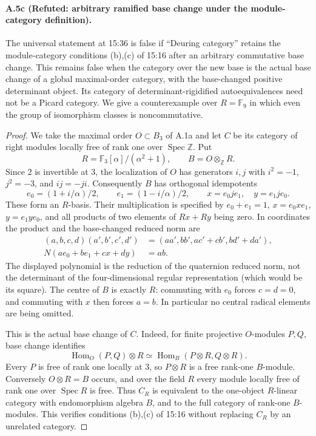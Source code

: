 \paragraph{A.5c (Refuted: arbitrary ramified base change under the module-category definition).}
The universal statement at 15:36 is false if ``Deuring category'' retains
the module-category conditions (b),(c) of 15:16 after an arbitrary
commutative base change. This remains false when the category over the
new base is the actual base change of a global maximal-order category,
with the base-changed positive determinant object. Its category of
determinant-rigidified autoequivalences need not be a Picard category.
We give a counterexample over $R=\mathbb F_9$ in which even the group
of isomorphism classes is noncommutative.

\begin{proof}
We take the maximal order $O\subset B_3$ of A.1a and let $C$ be its
category of right modules locally free of rank one over
$\operatorname{Spec}\mathbb Z$. Put
\[
 R=\mathbb F_3[\alpha]/(\alpha^2+1),\qquad B=O\otimes_{\mathbb Z}R.
\]
Since $2$ is invertible at $3$, the localization of $O$ has generators
$i,j$ with $i^2=-1$, $j^2=-3$, and $ij=-ji$. Consequently $B$ has
orthogonal idempotents
\[
 e_0=(1+i/\alpha)/2,\qquad e_1=(1-i/\alpha)/2,
 \qquad x=e_0je_1,\quad y=e_1je_0.
\]
These form an $R$-basis. Their multiplication is specified by
$e_0+e_1=1$, $x=e_0xe_1$, $y=e_1ye_0$, and all products of two
elements of $Rx+Ry$ being zero. In coordinates the product and the
base-changed reduced norm are
\begin{align*}
 (a,b,c,d)(a',b',c',d')
   &=(aa',bb',ac'+cb',bd'+da'),\\
 N(ae_0+be_1+cx+dy)&=ab.
\end{align*}
The displayed polynomial is the reduction of the quaternion reduced
norm, not the determinant of the four-dimensional regular
representation (which would be its square).
The centre of $B$ is exactly $R$: commuting with $e_0$ forces $c=d=0$,
and commuting with $x$ then forces $a=b$. In particular no central
radical elements are being omitted.

This is the actual base change of $C$. Indeed, for finite projective
$O$-modules $P,Q$, base change identifies
\[
 \operatorname{Hom}_O(P,Q)\otimes R
 \simeq \operatorname{Hom}_B(P\otimes R,Q\otimes R).
\]
Every $P$ is free of rank one locally at $3$, so $P\otimes R$ is a
free rank-one $B$-module. Conversely $O\otimes R=B$ occurs, and over
the field $R$ every module locally free of rank one over
$\operatorname{Spec}R$ is free. Thus $C_R$ is equivalent to the
one-object $R$-linear category with endomorphism algebra $B$, and to
the full category of rank-one $B$-modules. This verifies conditions
(b),(c) of 15:16 without replacing $C_R$ by an unrelated category.


\end{proof}
